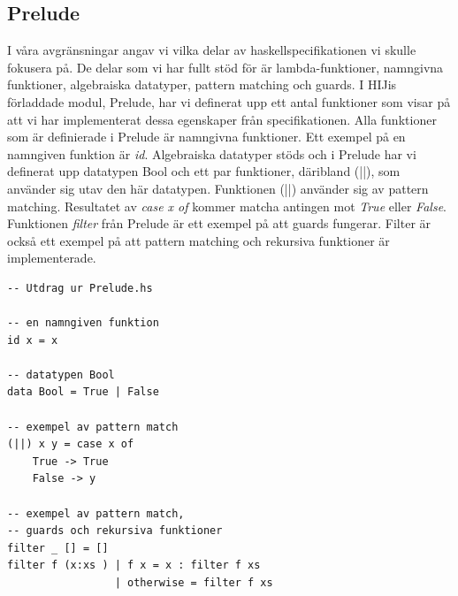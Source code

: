 \subsection{Prelude}
I våra avgränsningar angav vi vilka delar av haskellspecifikationen vi skulle fokusera på. De delar som vi har fullt stöd för är lambda-funktioner, namngivna funktioner, algebraiska datatyper, pattern matching och guards. 
I HIJis förladdade  modul, Prelude, har vi definerat upp ett antal funktioner som visar på att vi har implementerat dessa egenskaper från specifikationen.
Alla funktioner som är definierade i Prelude är namngivna funktioner. Ett exempel på en namngiven funktion är \emph{id}. 
Algebraiska datatyper stöds och i  Prelude har vi definerat upp datatypen Bool och ett par funktioner, däribland (||), som använder sig utav den här datatypen. Funktionen (||) använder sig av pattern matching. Resultatet av \emph{case x of} kommer matcha antingen mot \emph{True} eller \emph{False}.
Funktionen \emph{filter} från Prelude är ett exempel på att guards fungerar. Filter är också ett exempel på att pattern matching och rekursiva funktioner är implementerade. 

\begin{lstlisting}
-- Utdrag ur Prelude.hs

-- en namngiven funktion
id x = x

-- datatypen Bool
data Bool = True | False

-- exempel av pattern match
(||) x y = case x of
    True -> True
    False -> y

-- exempel av pattern match, 
-- guards och rekursiva funktioner
filter _ [] = []
filter f (x:xs ) | f x = x : filter f xs
                 | otherwise = filter f xs
\end{lstlisting}

